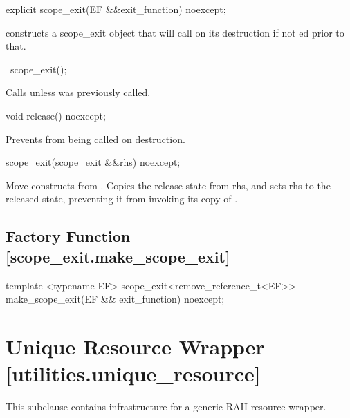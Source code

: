 \documentclass[ebook,11pt,article]{memoir}
\begin{document}
\begin{itemdecl}
explicit
scope_exit(EF &&exit_function) noexcept;
\end{itemdecl}


\pnum
\effects constructs a scope_exit object that will call  on its destruction if not ed prior to that.

\begin{itemdecl}
~scope_exit();
\end{itemdecl}

\pnum
\effects Calls  unless  was previously called.


\begin{itemdecl}
void release() noexcept;
\end{itemdecl}

\pnum
\effects Prevents  from being called on destruction.

\begin{itemdecl}
scope_exit(scope_exit  &&rhs) noexcept;
\end{itemdecl}

\pnum
\effects Move constructs  from .  Copies the release state from rhs, and sets rhs to the released state, preventing it from invoking its copy of .

\subsection {Factory Function  [scope_exit.make_scope_exit]}

\begin{itemdecl}
template <typename EF>
scope_exit<remove_reference_t<EF>> make_scope_exit(EF && exit_function) noexcept;
\end{itemdecl}

\pnum
\returns {}




\section{Unique Resource Wrapper [utilities.unique_resource]}
This subclause contains infrastructure for a generic RAII resource wrapper.
\end{document}
